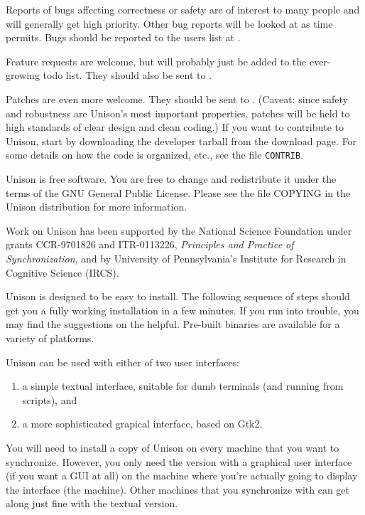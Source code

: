 \documentclass{article}
\begin{document}
Reports of bugs affecting correctness or safety are of interest to many
people and will generally get high priority.  Other bug reports will be
looked at as time permits.  Bugs should be reported to the users list at
\UNISONUSERS. 

Feature requests are welcome, but will probably just be added to the
ever-growing todo list.  They should also be sent to \UNISONUSERS.

Patches are even more welcome.  They should be sent to
\UNISONHACKERS.
(Caveat: since safety and robustness are Unison's most important properties,
patches will be held to high standards of clear design and clean coding.)
If you want to contribute to Unison, start by downloading the developer
tarball from the download page.  For some details on how the code is
organized, etc., see the file {\tt CONTRIB}.


Unison is free software.  You are free to change and redistribute it
under the terms of the GNU General Public License.  Please see the
file COPYING in the Unison distribution for more information.


Work on Unison has been supported by the National Science Foundation
under grants CCR-9701826 and ITR-0113226, {\em Principles and Practice of
  Synchronization}, and by University of Pennsylvania's Institute for
Research in Cognitive Science (IRCS).


Unison is designed to be easy to install.  The following sequence of
steps should get you a fully working installation in a few minutes.  If
you run into trouble, you may find the suggestions on the 
 helpful.  Pre-built binaries are available for a
variety of platforms.

Unison can be used with either of two user interfaces: 
\begin{enumerate}
\item a simple textual interface, suitable for dumb terminals (and
running from scripts), and 
\item a more sophisticated grapical interface, based on Gtk2.  
\end{enumerate}

You will need to install a copy of Unison on every machine that you
want to synchronize.  However, you only need the version with a
graphical user interface (if you want a GUI at all) on the machine
where you're actually going to display the interface (the \CLIENT{}
machine).  Other machines that you synchronize with can get along just
fine with the textual version.
\end{document}
